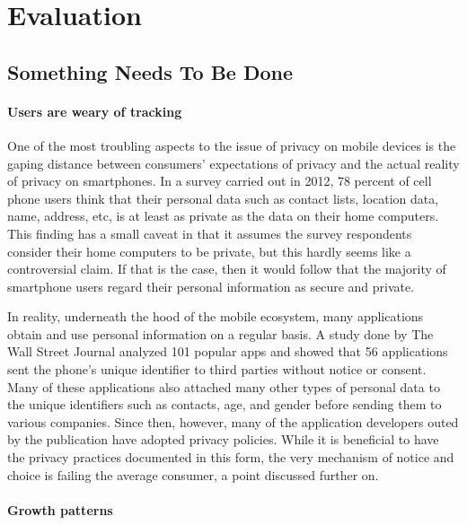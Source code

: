 \section{Evaluation}

	\subsection{Something Needs To Be Done}

		\paragraph {Users are weary of tracking}

One of the most troubling aspects to the issue of privacy on mobile devices is the gaping distance between consumers' expectations of privacy and the actual reality of privacy on smartphones. In a survey carried out in 2012, 78 percent of cell phone users think that their personal data such as contact lists, location data, name, address, etc, is at least as private as the data on their home computers\cite{Jenn2012}. This finding has a small caveat in that it assumes the survey respondents consider their home computers to be private, but this hardly seems like a controversial claim. If that is the case, then it would follow that the majority of smartphone users regard their personal information as secure and private. 


In reality, underneath the hood of the mobile ecosystem, many applications obtain and use personal information on a regular basis. 
A study done by The Wall Street Journal analyzed 101 popular apps and showed that 56 applications sent the phone's unique identifier to third parties without notice or consent\cite{Thru2010}. Many of these applications also attached many other types of personal data to the unique identifiers such as contacts, age, and gender before sending them to various companies. Since then, however, many of the application developers outed by the publication have adopted privacy policies. While it is beneficial to have the privacy practices documented in this form, the very mechanism of notice and choice is failing the average consumer, a point discussed further on. 

		\paragraph {Growth patterns}

